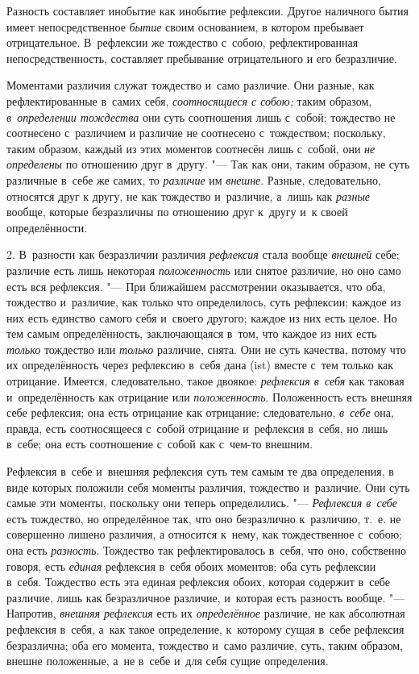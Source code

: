Разность составляет инобытие как инобытие рефлексии. Другое наличного бытия
имеет непосредственное {\em бытие} своим основанием, в
котором пребывает отрицательное. В~рефлексии же тождество с~собою,
рефлектированная непосредственность, составляет пребывание отрицательного и
его безразличие.

Моментами различия служат тождество и~само различие. Они разные, как
рефлектированные в~самих себя, {\em соотносящиеся с
собою;} таким образом, {\em в~определении тождества}
они суть соотношения лишь с~собой; тождество не соотнесено с~различием и
различие не соотнесено с~тождеством; поскольку, таким образом, каждый из
этих моментов соотнесён лишь с~собой, они {\em не
определены} по отношению друг в~другу. "--- Так как они, таким образом, не
суть различные в~себе же самих, то {\em различие} им
{\em внешне}. Разные, следовательно, относятся друг к
другу, не как тождество и~различие, а~лишь как
{\em разные} вообще, которые безразличны по отношению
друг к~другу и~к своей определённости.

2. В~разности как безразличии различия {\em рефлексия}
стала вообще {\em внешней} себе; различие есть лишь
некоторая {\em положенность} или снятое различие, но
оно само есть вся рефлексия. "--- При ближайшем рассмотрении оказывается, что
оба, тождество и~различие, как только что определилось, суть рефлексии;
каждое из них есть единство самого себя и~своего другого; каждое из них
есть целое. Но тем самым определённость, заключающаяся в~том, что каждое из
них есть {\em только} тождество или
{\em только} различие, снята. Они не суть качества,
потому что их определённость через рефлексию в~себя дана (ist) вместе с~тем
только как отрицание. Имеется, следовательно, такое двоякое:
{\em рефлексия в~себя} как таковая и~определённость
как отрицание или {\em положенность}. Положенность есть
внешняя себе рефлексия; она есть отрицание как отрицание; следовательно,
{\em в~себе} она, правда, есть соотносящееся с~собой
отрицание и~рефлексия в~себя, но лишь в~себе; она есть соотношение с~собой
как с~чем-то внешним.

Рефлексия в~себе и~внешняя рефлексия суть тем самым те два определения, в
виде которых положили себя моменты различия, тождество и~различие. Они суть
самые эти моменты, поскольку они теперь определились. "---
{\em Рефлексия в~себе} есть тождество, но определённое
так, что оно безразлично к~различию, т.~е. не совершенно лишено различия, а
относится к~нему, как тождественное с~собою; она есть
{\em разность}. Тождество так рефлектировалось в~себя,
что оно, собственно говоря, есть {\em единая} рефлексия
в~себя обоих моментов; оба суть рефлексии в~себя. Тождество есть эта единая
рефлексия обоих, которая содержит в~себе различие, лишь как безразличное
различие, и~которая есть разность вообще. "--- Напротив,
{\em внешняя рефлексия} есть их
{\em определённое} различие, не как абсолютная
рефлексия в~себя, а~как такое определение, к~которому сущая в~себе
рефлексия безразлична; оба его момента, тождество и~само различие, суть,
таким образом, внешне положенные, а~не в~себе и~для себя сущие определения.

